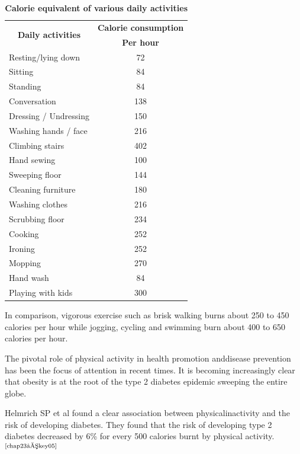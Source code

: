 {
\begin{table}[H]
\centering
\caption*{\textbf{Calorie equivalent of various daily activities}}
\small\addtolength{\tabcolsep}{-1pt}
\begin{tabular}{|l|c|}
\hline
\multicolumn{1}{|c|}{\multirow{2}{2.3cm}{\textbf{Daily activities}}} & \multicolumn{1}{c|}{\textbf{Calorie consumption}}\\
 & \multicolumn{1}{c|}{\textbf{Per hour}}\\
\hline
Resting/lying down & 72\\
\hline
Sitting & 84\\
\hline
Standing & 84\\
\hline
Conversation & 138\\
\hline
Dressing / Undressing & 150\\
\hline
Washing hands / face & 216\\
\hline
Climbing stairs & 402\\
\hline
Hand sewing & 100\\
\hline
Sweeping floor & 144\\
\hline
Cleaning furniture & 180\\
\hline
Washing clothes & 216\\
\hline
Scrubbing floor & 234\\
\hline
Cooking & 252\\
\hline
Ironing & 252\\
\hline
Mopping & 270\\
\hline
Hand wash & 84\\
\hline
Playing with kids & 300\\
\hline
\end{tabular}
\end{table}
}\relax
In comparison, vigorous exercise such as brisk walking burns about 250 to 450 calories per hour while jogging, cycling and swimming burn about 400 to 650 calories per hour.


The pivotal role of physical activity in health promotion and\break disease prevention has been the focus of attention in recent times. It is becoming increasingly clear that obesity is at the root of the type 2 diabetes epidemic sweeping the entire globe.

Helmrich SP et al found a clear association between physical\break inactivity and the risk of developing diabetes. They found that the risk of developing type 2 diabetes decreased by 6\% for every 500 calories burnt by physical activity.$^{\text{\cite{chap23–key05}}}$


